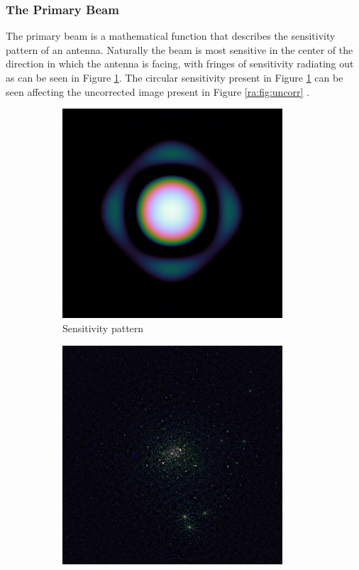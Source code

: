 \subsubsection{The Primary Beam}\label{ra:ssec:tpb}
The primary beam is a mathematical function that describes the sensitivity pattern of an antenna. Naturally the beam is most sensitive in the center of the direction in which the antenna is facing, with fringes of sensitivity radiating out as can be seen in Figure \ref{ra:fig:beam}. The circular sensitivity present in Figure \ref{ra:fig:beam} can be seen affecting the uncorrected image present in Figure \ref{ra:fig:uncorr} \citep{thompson2008interferometry}.
%
\begin{figure}[H]
  \begin{subfigure}{0.45\textwidth}
	\centering
	\includegraphics[width=0.9\textwidth]{Images/beam.png}
	\caption{Sensitivity pattern}
	\label{ra:fig:beam}
  \end{subfigure}
  \begin{subfigure}{0.45\textwidth}
	\centering
	\includegraphics[width=0.9\textwidth]{Images/uncorrected-image.png}

\end{subfigure}
\end{figure}

